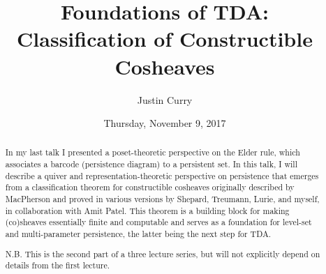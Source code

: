 \documentclass{UAmathtalk}
\author{Justin Curry}
\title{Foundations of TDA:\\Classification of Constructible Cosheaves}
\date{Thursday, November 9, 2017}
\begin{document}
\maketitle

\begin{abstract}
In my last talk I presented a poset-theoretic perspective on the Elder rule, which associates a barcode (persistence diagram) to a persistent set. In this talk, I will describe a quiver and representation-theoretic perspective on persistence that emerges from a classification theorem for constructible cosheaves originally described by MacPherson and proved in various versions by Shepard, Treumann, Lurie, and myself, in collaboration with Amit Patel. This theorem is a building block for making (co)sheaves essentially finite and computable and serves as a foundation for level-set and multi-parameter persistence, the latter being the next step for TDA.
\bigskip

\noindent N.B. This is the second part of a three lecture series, but will not explicitly depend on details from the first lecture.
\end{abstract}
\end{document}
